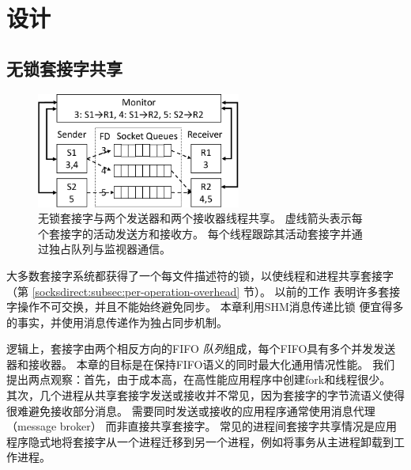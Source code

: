 
\section{设计}
\label{socksdirect:sec:design}


\subsection{无锁套接字共享}
\label{socksdirect:subsec:fork}


\begin{figure}[htbp]
	\centering
	\includegraphics[width=0.6\textwidth]{images/queue_arch}
	
	\caption{无锁套接字与两个发送器和两个接收器线程共享。 虚线箭头表示每个套接字的活动发送方和接收方。 每个线程跟踪其活动套接字并通过独占队列与监视器通信。}
	\label{socksdirect:fig:queue-arch}
\end{figure}

大多数套接字系统都获得了一个每文件描述符的锁，以使线程和进程共享套接字（第 \ref {socksdirect:subsec:per-operation-overhead} 节）。
以前的工作 \cite {boyd2010analysis,clements2015scalable} 表明许多套接字操作不可交换，并且不能始终避免同步。
本章利用SHM消息传递比锁 \cite {roghanchi2017ffwd} 便宜得多的事实，并使用消息传递作为独占同步机制。

逻辑上，套接字由两个相反方向的FIFO \emph {队列}组成，每个FIFO具有多个并发发送器和接收器。
本章的目标是在保持FIFO语义的同时最大化通用情况性能。
我们提出两点观察：首先，由于成本高，在高性能应用程序中创建fork和线程很少。
其次，几个进程从共享套接字发送或接收并不常见，因为套接字的字节流语义使得很难避免接收部分消息。
需要同时发送或接收的应用程序通常使用消息代理（message broker） \cite {hintjens2013zeromq,rabbitmq2017rabbitmq,kreps2011kafka} 而非直接共享套接字。
常见的进程间套接字共享情况是应用程序隐式地将套接字从一个进程迁移到另一个进程，例如将事务从主进程卸载到工作进程。

